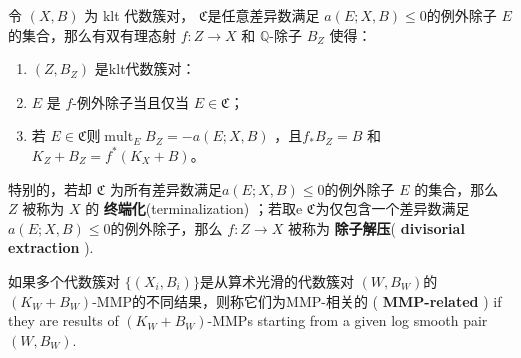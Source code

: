\begin{corollary}\label{extraction}
	\cite[Corollary 13.7]{haconMinimalModelProgram2012} 令 $ (X,B) $ 为 klt 代数簇对， $\mathfrak{C}$是任意差异数满足 $ a(E;X,B)\leqslant 0 $的例外除子 $E$ 的集合，那么有双有理态射 $ f:Z\to X $ 和 $ \mathbb{Q} $-除子 $ B_Z $ 使得：
	\begin{enumerate}
		\item $ (Z,B_Z) $ 是klt代数簇对：
		\item $ E $ 是 $f$-例外除子当且仅当 $ E\in \mathfrak{C} $；
		\item  若 $E \in \mathfrak{C}$则$ \operatorname{mult}_{E}B_Z=-a(E;X,B) $ ，且$ f_*B_Z=B $ 和 $ K_Z+B_Z=f^*(K_X+B) $。
	\end{enumerate}
	特别的，若却 $\mathfrak{C}$ 为所有差异数满足$a(E; X, B)\leqslant 0$的例外除子 $E$ 的集合，那么 $ Z $ 被称为 $X$ 的 \textbf{终端化}(terminalization) ；若取e $\mathfrak{C}$为仅包含一个差异数满足 $a(E; X, B)\leqslant 0$的例外除子，那么 $ f: Z\to X $ 被称为 \textbf{除子解压}( \textbf{divisorial extraction} ).
\end{corollary}

\begin{definition}
	\cite[Definition 3.3]{brunoLogSarkisovProgram1995}
	如果多个代数簇对 $ \{(X_i,B_i)\} $是从算术光滑的代数簇对 $(W,B_{W})$的 $(K_{W}+B_{W}) $-MMP的不同结果，则称它们为MMP-相关的 ( \textbf{MMP-related} ) if they are results of $ (K_W+B_W) $-MMPs starting from a given log smooth pair $(W,B_{W})$.
\end{definition}

